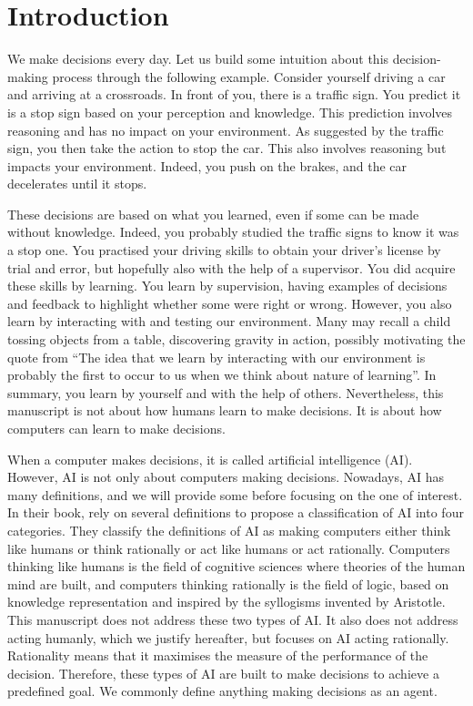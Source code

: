 \chapter{Introduction}\label{ch:introduction}

We make decisions every day.
Let us build some intuition about this decision-making process through the following example.
Consider yourself driving a car and arriving at a crossroads.
In front of you, there is a traffic sign.
You predict it is a stop sign based on your perception and knowledge.
This prediction involves reasoning and has no impact on your environment.
As suggested by the traffic sign, you then take the action to stop the car.
This also involves reasoning but impacts your environment.
Indeed, you push on the brakes, and the car decelerates until it stops.

These decisions are based on what you learned, even if some can be made without knowledge.
Indeed, you probably studied the traffic signs to know it was a stop one.
You practised your driving skills to obtain your driver's license by trial and error, but hopefully also with the help of a supervisor.
You did acquire these skills by learning.
You learn by supervision, having examples of decisions and feedback to highlight whether some were right or wrong.
However, you also learn by interacting with and testing our environment.
Many may recall a child tossing objects from a table, discovering gravity in action, possibly motivating the quote from \cite{sutton2018reinforcement} ``The idea that we learn by interacting with our environment is probably the first to occur to us when we think about nature of learning''.
In summary, you learn by yourself and with the help of others.
Nevertheless, this manuscript is not about how humans learn to make decisions.
It is about how computers can learn to make decisions.

When a computer makes decisions, it is called artificial intelligence (AI).
However, AI is not only about computers making decisions.
Nowadays, AI has many definitions, and we will provide some before focusing on the one of interest.
In their book, \cite{russel2010} rely on several definitions to propose a classification of AI into four categories.
They classify the definitions of AI as making computers either think like humans or think rationally or act like humans or act rationally.
Computers thinking like humans is the field of cognitive sciences where theories of the human mind are built, and computers thinking rationally is the field of logic, based on knowledge representation and inspired by the syllogisms invented by Aristotle.
This manuscript does not address these two types of AI.
It also does not address acting humanly, which we justify hereafter, but focuses on AI acting rationally.
Rationality means that it maximises the measure of the performance of the decision.
Therefore, these types of AI are built to make decisions to achieve a predefined goal.
We commonly define anything making decisions as an agent.

